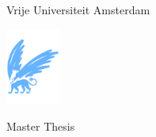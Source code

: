 \begin{titlepage}
    \begin{addmargin}[-1cm]{-3cm}

%
%
%
%
%
%
%
%
%
%

    \begin{center}

    Vrije Universiteit Amsterdam%

    \vspace{1mm}

    \includegraphics[height=25mm]{figures/vu-griffioen.pdf}


    \vspace{2cm}

    {\Large Master Thesis}

    \vspace*{1.5cm}


\end{center}
\end{addmargin}
\end{titlepage}
